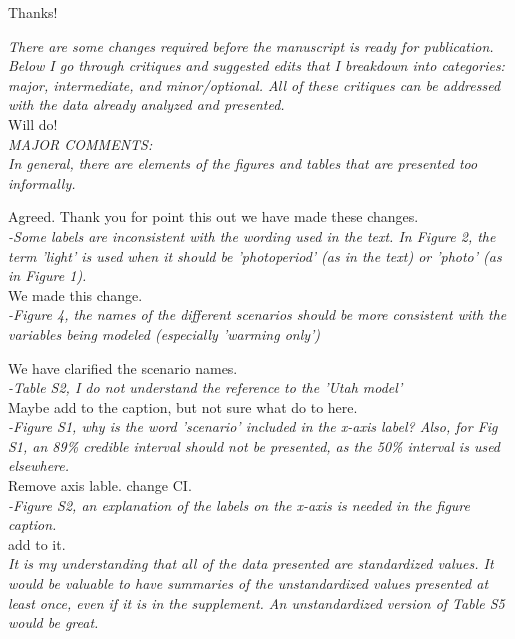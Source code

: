 \documentclass[11pt]{article}
\begin{document}
Thanks!

\emph{There are some changes required before the manuscript is ready for publication. Below I go through critiques and suggested edits that I breakdown into categories: major, intermediate, and minor/optional. All of these critiques can be addressed with the data already analyzed and presented.}\\

Will do!\\

\emph{MAJOR COMMENTS:\\
In general, there are elements of the figures and tables that are presented too informally.}

Agreed. Thank you for point this out we have made these changes.\\

\emph{-Some labels are inconsistent with the wording used in the text. In Figure 2, the term 'light' is used when it should be 'photoperiod' (as in the text) or 'photo' (as in Figure 1).}\\

We made this change.\\

\emph{-Figure 4, the names of the different scenarios should be more consistent with the variables being modeled (especially 'warming only')}

We have clarified the scenario names.\\

\emph{-Table S2, I do not understand the reference to the 'Utah model'}\\

Maybe add to the caption, but not sure what do to here.\\


\emph{-Figure S1, why is the word 'scenario' included in the x-axis label? Also, for Fig S1, an 89\% credible interval should not be presented, as the 50\% interval is used elsewhere.}\\

Remove axis lable. change CI.\\

\emph{-Figure S2, an explanation of the labels on the x-axis is needed in the figure caption.}\\

add to it.\\


\emph{It is my understanding that all of the data presented are standardized values. It would be valuable to have summaries of the unstandardized values presented at least once, even if it is in the supplement. An unstandardized version of Table S5 would be great.}\\
\end{document}
